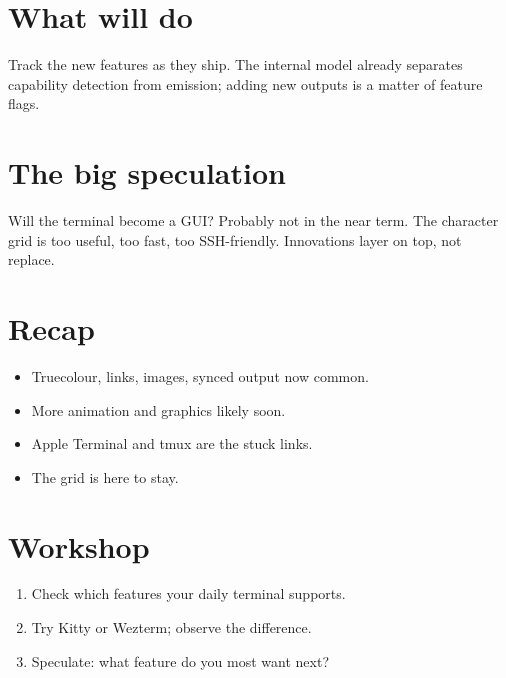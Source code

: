 \section{What \maya{} will do}

Track the new features as they ship. The internal model
already separates capability detection from emission;
adding new outputs is a matter of feature flags.

\section{The big speculation}

Will the terminal become a GUI? Probably not in the
near term. The character grid is too useful, too fast,
too SSH-friendly. Innovations layer on top, not replace.

\section{Recap}

\begin{recap}
\begin{itemize}[leftmargin=*]
  \item Truecolour, links, images, synced output now
    common.
  \item More animation and graphics likely soon.
  \item Apple Terminal and tmux are the stuck links.
  \item The grid is here to stay.
\end{itemize}
\end{recap}

\section*{Workshop}

\begin{enumerate}[leftmargin=*]
  \item Check which features your daily terminal
    supports.
  \item Try Kitty or Wezterm; observe the difference.
  \item Speculate: what feature do you most want next?
\end{enumerate}
